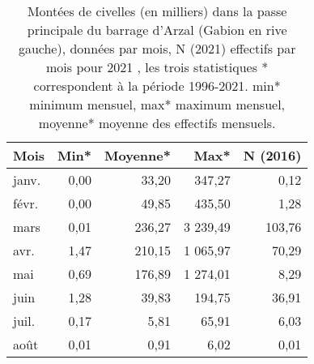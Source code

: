 \begin{table}[htbp]
\centering
\begin{tabular}{lrrrr}
  \hline
Mois & Min* & Moyenne* & Max* & N (2016) \\ 
  \hline
janv. & 0,00 & 33,20 & 347,27 & 0,12 \\ 
  févr. & 0,00 & 49,85 & 435,50 & 1,28 \\ 
  mars & 0,01 & 236,27 & 3 239,49 & 103,76 \\ 
  avr. & 1,47 & 210,15 & 1 065,97 & 70,29 \\ 
  mai & 0,69 & 176,89 & 1 274,01 & 8,29 \\ 
  juin & 1,28 & 39,83 & 194,75 & 36,91 \\ 
  juil. & 0,17 & 5,81 & 65,91 & 6,03 \\ 
  août & 0,01 & 0,91 & 6,02 & 0,01 \\ 
   \hline
\end{tabular}
\caption{Montées de civelles \textsf{(en milliers)} dans la passe principale du barrage
 d'Arzal (Gabion en rive gauche), données par mois, \textsf{N (2021)} effectifs par mois pour 2021 , les trois statistiques * correspondent à la période
        1996-2021.	\textsf{min}* minimum mensuel, \textsf{max}* maximum mensuel, 
\textsf{moyenne}* moyenne des effectifs mensuels.} 
\label{table_civelle_mois_6}
\end{table}
